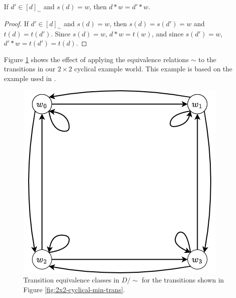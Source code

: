 \begin{proposition}\label{prp:equivalence-class-on-vertex}
    If $d' \in [d]_{\sim}$ and $s(d)=w$, then $d * w = d' * w$.
\end{proposition}\begin{proof}
    If $d' \in [d]_{\sim}$ and $s(d)=w$, then $s(d)=s(d')=w$ and $t(d)=t(d')$.
    Since $s(d)=w$, $d * w = t(w)$, and since $s(d')=w$, $d' * w = t(d') = t(d)$.
\end{proof}


Figure \ref{fig:2x2-cyclical-min-trans-equivalence} shows the effect of applying the equivalence relations $\sim$ to the transitions in our $2 \times 2$ cyclical example world.
This example is based on the example used in \cite{Higgins2018}.

\begin{figure}[H]
    \centering
    \includegraphics[width=0.5\linewidth]{ToUse/Paper discards/Images/2x2-cyclical-min-trans-equivalence.png}
    \caption{Transition equivalence classes in $D/\sim$ for the transitions shown in Figure \ref{fig:2x2-cyclical-min-trans}.}
    \label{fig:2x2-cyclical-min-trans-equivalence}
\end{figure}


